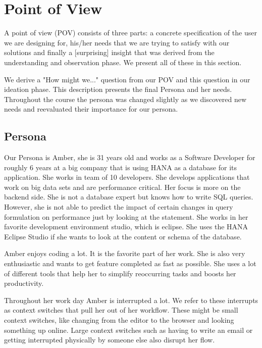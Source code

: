 
\section{Point of View} \label{sec:POINT_OF_VIEW}

A point of view (POV) consists of three parts: a concrete specification of the user we are designing for, his/her needs that we are trying to satisfy with our solutions and finally a [surprising] insight that was derived from the understanding and observation phase. We present all of these in this section.

We derive a "How might we..." question from our POV and this question in our ideation phase. This description presents the final Persona and her needs. Throughout the course the persona was changed slightly as we discovered new needs and reevaluated their importance for our persona. 

\subsection{Persona}
\label{subsec:persona}

Our Persona is Amber, she is 31 years old and works as a Software Developer for roughly 6 years at a big company that is using HANA as a database for its application. She works in team of 10 developers. She develops applications that work on big data sets and are performance critical. Her focus is more on the backend side. She is not a database expert but knows how to write SQL queries. However, she is not able to predict the impact of certain changes in query formulation on performance just by looking at the statement. She works in her favorite development environment studio, which is eclipse. She uses the HANA Eclipse Studio if she wants to look at the content or schema of the database.

Amber enjoys coding a lot. It is the favorite part of her work. She is also very enthusiastic and wants to get feature completed as fast as possible. She uses a lot of different tools that help her to simplify reoccurring tasks and boosts her productivity.

Throughout her work day Amber is interrupted a lot. We refer to these interrupts as context switches that pull her out of her workflow. These might be small context switches, like changing from the editor to the browser and looking something up online. Large context switches such as having to write an email or getting interrupted physically by someone else also disrupt her flow.

